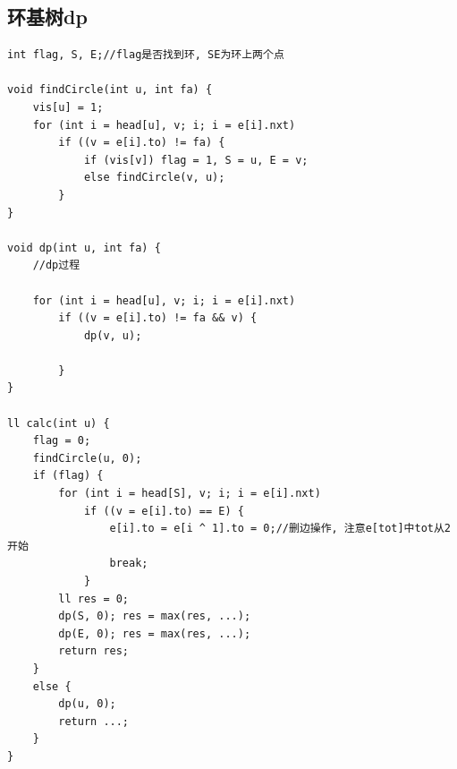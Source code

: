 \documentclass[twoside]{article}
\begin{document}
\subsection{环基树dp}
\begin{lstlisting}
int flag, S, E;//flag是否找到环, SE为环上两个点

void findCircle(int u, int fa) {
    vis[u] = 1;
    for (int i = head[u], v; i; i = e[i].nxt)
        if ((v = e[i].to) != fa) {
            if (vis[v]) flag = 1, S = u, E = v;
            else findCircle(v, u);
        }
}

void dp(int u, int fa) {
    //dp过程

    for (int i = head[u], v; i; i = e[i].nxt)
        if ((v = e[i].to) != fa && v) {
            dp(v, u);

        }
}

ll calc(int u) {
    flag = 0;
    findCircle(u, 0);
    if (flag) {
        for (int i = head[S], v; i; i = e[i].nxt)
            if ((v = e[i].to) == E) {
                e[i].to = e[i ^ 1].to = 0;//删边操作, 注意e[tot]中tot从2开始
                break;
            }
        ll res = 0;
        dp(S, 0); res = max(res, ...);
        dp(E, 0); res = max(res, ...);
        return res;
    }
    else {
        dp(u, 0);
        return ...;
    }
}
\end{lstlisting}
\end{document}
